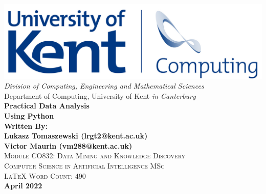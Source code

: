 \begin{titlepage}
\newcommand{\HRule}{\rule{\linewidth}{0.5mm}}
\begin{centering} 
\includegraphics[scale=0.95]{Media/MediaBin/uksc_logo.png} \\
\vspace{0.8cm} 
\large{\emph{Division of Computing, Engineering and Mathematical Sciences}} \\ [0.1cm]
\large{{Department of Computing, University of Kent \emph{in Canterbury}}} \\ [2cm]
\Huge{\bfseries{Practical Data Analysis \\ Using Python}} \\ [2cm]
{\Large{\bfseries{Written By: \\ [0.2cm] \Large{Lukasz Tomaszewski \Large{(lrgt2@kent.ac.uk)}} \\ \Large{Victor Maurin \Large{(vm288@kent.ac.uk)}}}}}\\[1cm]
\textsc{\large Module CO832: Data Mining and Knowledge Discovery}\\ [-0.2cm]
\textsc{\large Computer Science in Artificial Intelligence MSc}\\ [-0.2cm]
\textsc{\large LaTeX Word Count: 490}\\ [1.5cm]
\textbf{\Large{April 2022}}\\
\end{centering} 
\end{titlepage}
